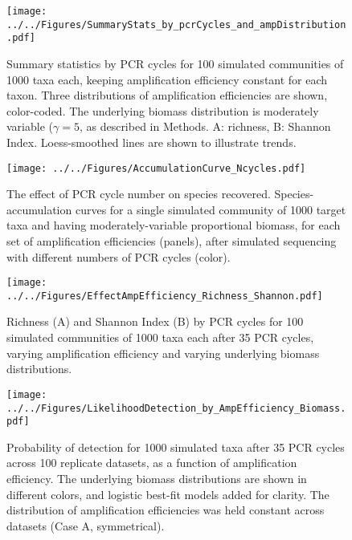 \documentclass[fleqn,11pt,lineno]{wlscirep}
\begin{document}
\begin{figure}[!ht]
\begin{center}
\texttt{[image: ../../Figures/SummaryStats\_by\_pcrCycles\_and\_ampDistribution.pdf]}
\caption{Summary statistics by PCR cycles for 100 simulated communities of 1000 taxa each, keeping amplification efficiency constant for each taxon. Three distributions of amplification efficiencies are shown, color-coded. The underlying biomass distribution is moderately variable ($\gamma = 5$, as described in Methods. A: richness, B: Shannon Index. Loess-smoothed lines are shown to illustrate trends.}
\end{center}
\end{figure}



\begin{figure}[!ht]
\begin{center}
\texttt{[image: ../../Figures/AccumulationCurve\_Ncycles.pdf]}
\caption{The effect of PCR cycle number on species recovered. Species-accumulation curves for a single simulated community of 1000 target taxa and having moderately-variable proportional biomass, for each set of amplification efficiencies (panels), after simulated sequencing with different numbers of PCR cycles (color).}
\end{center}
\end{figure}


\begin{figure}[!hbt]
        \centering
		  \texttt{[image: ../../Figures/EffectAmpEfficiency\_Richness\_Shannon.pdf]}
		  \caption{Richness (A) and Shannon Index (B) by PCR cycles for 100 simulated communities of 1000 taxa each after 35 PCR cycles, varying amplification efficiency and varying underlying biomass distributions.}
\end{figure}


\begin{figure}[!hbt]
  \centering
  \texttt{[image: ../../Figures/LikelihoodDetection\_by\_AmpEfficiency\_Biomass.pdf]}
  \caption{Probability of detection for 1000 simulated taxa after 35 PCR cycles across 100 replicate datasets, as a function of amplification efficiency. The underlying biomass distributions are shown in different colors, and logistic best-fit models added for clarity. The distribution of amplification efficiencies was held constant across datasets (Case A, symmetrical).}
\end{figure}
\end{document}
